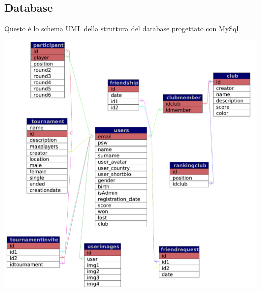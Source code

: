 \documentclass{article}
\begin{document}
\subsection{Database}
    Questo è lo schema UML della struttura del database progettato con MySql
    \begin{center}
        \includegraphics[width=15cm]{images/schemapng}
    \end{center}
\end{document}
